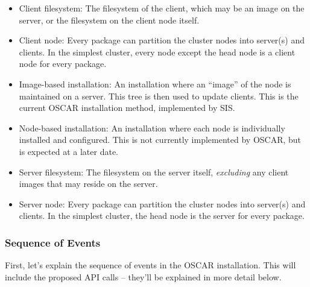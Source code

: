 \begin{itemize}
\item Client filesystem: The filesystem of the client, which may be an
  image on the server, or the filesystem on the client node itself.
  
\item Client node: Every package can partition the cluster nodes into
  server(s) and clients.  In the simplest cluster, every node except
  the head node is a client node for every package.
  
\item Image-based installation: An installation where an ``image'' of
  the node is maintained on a server.  This tree is then used to
  update clients.  This is the current OSCAR installation method,
  implemented by SIS.
  
\item Node-based installation: An installation where each node is
  individually installed and configured.  This is not currently
  implemented by OSCAR, but is expected at a later date.
  
\item Server filesystem: The filesystem on the server itself, {\em
    excluding} any client images that may reside on the server.
  
\item Server node: Every package can partition the cluster nodes into
  server(s) and clients.  In the simplest cluster, the head node is the
  server for every package.
\end{itemize}


\subsubsection{Sequence of Events}

First, let's explain the sequence of events in the OSCAR installation.
This will include the proposed API calls -- they'll be explained in
more detail below.  

